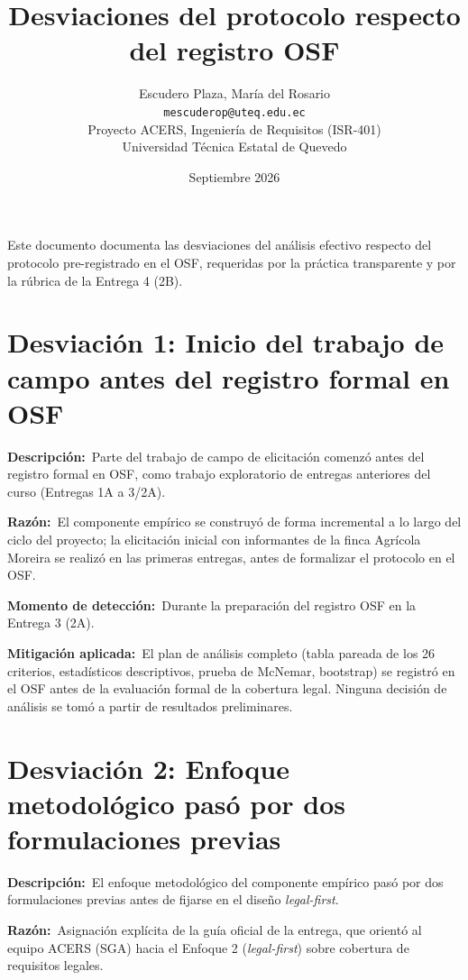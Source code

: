 \documentclass[11pt,a4paper]{article}
\title{\textbf{Desviaciones del protocolo respecto del registro OSF}}
\author{Escudero Plaza, Mar\'{i}a del Rosario\\
\texttt{mescuderop@uteq.edu.ec}\\
\vspace{0.3em}
\small Proyecto ACERS, Ingenier\'{i}a de Requisitos (ISR-401)\\
\small Universidad T\'{e}cnica Estatal de Quevedo}
\date{Septiembre 2026}
\begin{document}
\maketitle
\thispagestyle{empty}

Este documento documenta las desviaciones del an\'{a}lisis efectivo respecto del
protocolo pre-registrado en el OSF, requeridas por la pr\'{a}ctica transparente
y por la r\'{u}brica de la Entrega 4 (2B).

\section*{Desviaci\'{o}n 1: Inicio del trabajo de campo antes del registro formal en OSF}

\textbf{Descripci\'{o}n:}~Parte del trabajo de campo de elicitaci\'{o}n
comenz\'{o} antes del registro formal en OSF, como trabajo exploratorio de
entregas anteriores del curso (Entregas 1A a 3/2A).

\textbf{Raz\'{o}n:}~El componente emp\'{i}rico se construy\'{o} de forma
incremental a lo largo del ciclo del proyecto; la elicitaci\'{o}n inicial con
informantes de la finca Agr\'{i}cola Moreira se realiz\'{o} en las primeras
entregas, antes de formalizar el protocolo en el OSF.

\textbf{Momento de detecci\'{o}n:}~Durante la preparaci\'{o}n del registro OSF
en la Entrega 3 (2A).

\textbf{Mitigaci\'{o}n aplicada:}~El plan de an\'{a}lisis completo (tabla pareada
de los 26 criterios, estad\'{i}sticos descriptivos, prueba de McNemar, bootstrap)
se registr\'{o} en el OSF antes de la evaluaci\'{o}n formal de la cobertura legal.
Ninguna decisi\'{o}n de an\'{a}lisis se tom\'{o} a partir de resultados
preliminares.

\section*{Desviaci\'{o}n 2: Enfoque metodol\'{o}gico pas\'{o} por dos formulaciones previas}

\textbf{Descripci\'{o}n:}~El enfoque metodol\'{o}gico del componente
emp\'{i}rico pas\'{o} por dos formulaciones previas antes de fijarse en el
dise\~{n}o \emph{legal-first}.

\textbf{Raz\'{o}n:}~Asignaci\'{o}n expl\'{i}cita de la gu\'{i}a oficial de la
entrega, que orient\'{o} al equipo ACERS (SGA) hacia el Enfoque 2
(\emph{legal-first}) sobre cobertura de requisitos legales.
\end{document}
